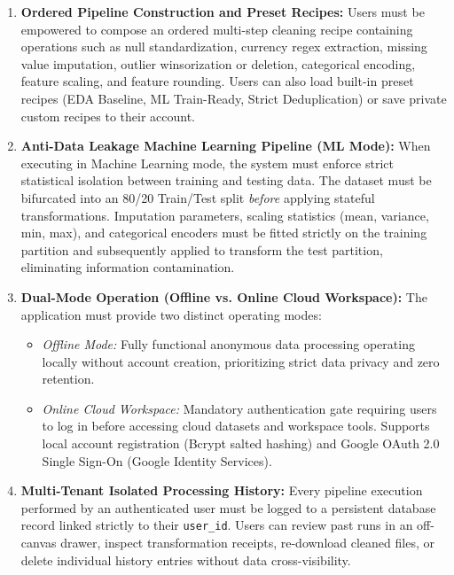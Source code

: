 \begin{enumerate}[label=\textbf{FR\arabic*.}]
\begin{itemize}
    \item \emph{Uniformity (25 pts):} Measures data type consistency across features ($25 \times \text{valid\_cols} / \text{total\_cols}$).
    \item \emph{Row Retention (25 pts):} Evaluates sample preservation following row filtering ($25 \times \text{final\_rows} / \text{initial\_rows}$).
  \end{itemize}
  The health module must also output actionable diagnostic warnings (e.g., high-cardinality text columns, extreme skewness).
  \item \textbf{Ordered Pipeline Construction and Preset Recipes:} Users must be empowered to compose an ordered multi-step cleaning recipe containing operations such as null standardization, currency regex extraction, missing value imputation, outlier winsorization or deletion, categorical encoding, feature scaling, and feature rounding. Users can also load built-in preset recipes (EDA Baseline, ML Train-Ready, Strict Deduplication) or save private custom recipes to their account.
  \item \textbf{Anti-Data Leakage Machine Learning Pipeline (ML Mode):} When executing in Machine Learning mode, the system must enforce strict statistical isolation between training and testing data. The dataset must be bifurcated into an 80/20 Train/Test split \emph{before} applying stateful transformations. Imputation parameters, scaling statistics (mean, variance, min, max), and categorical encoders must be fitted strictly on the training partition and subsequently applied to transform the test partition, eliminating information contamination.
  \item \textbf{Dual-Mode Operation (Offline vs. Online Cloud Workspace):} The application must provide two distinct operating modes:
  \begin{itemize}
    \item \emph{Offline Mode:} Fully functional anonymous data processing operating locally without account creation, prioritizing strict data privacy and zero retention.
    \item \emph{Online Cloud Workspace:} Mandatory authentication gate requiring users to log in before accessing cloud datasets and workspace tools. Supports local account registration (Bcrypt salted hashing) and Google OAuth 2.0 Single Sign-On (Google Identity Services).
  \end{itemize}
  \item \textbf{Multi-Tenant Isolated Processing History:} Every pipeline execution performed by an authenticated user must be logged to a persistent database record linked strictly to their \texttt{user\_id}. Users can review past runs in an off-canvas drawer, inspect transformation receipts, re-download cleaned files, or delete individual history entries without data cross-visibility.

\end{enumerate}
